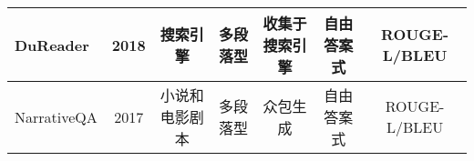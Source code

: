 \begin{table}[ht]
{\begin{tabular}{l c c c c c c}
			\midrule
			DuReader\upcite{DuReader}&2018&搜索引擎&多段落型&收集于搜索引擎&自由答案式&ROUGE-L/BLEU\\
			\midrule
			NarrativeQA\upcite{NarrativeQA}&2017&小说和电影剧本&多段落型&众包生成&自由答案式&ROUGE-L/BLEU\\
			\bottomrule
		\end{tabular}
	}
\end{table}



